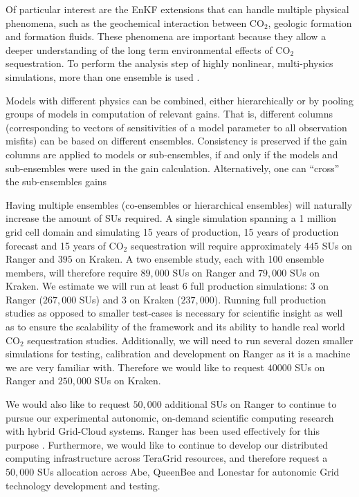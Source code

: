 \documentclass[a4paper,10pt]{article}
\begin{document}
Of particular interest are the EnKF extensions that can handle multiple physical phenomena,
such as the geochemical interaction between CO$_2$, geologic formation and formation fluids.
These phenomena are important because they allow a deeper understanding
of the long term environmental effects of CO$_2$ sequestration. To perform the analysis
step of highly nonlinear, multi-physics simulations, more than one ensemble is used 
\cite{Zhang,White1987,Durlofsky1992,Ballin1993,Gilks96,vanLeeuwen2003}.

Models with different physics can be combined, either hierarchically or by pooling 
groups of models in computation of relevant gains. That is, different  columns (corresponding to  
vectors of sensitivities of a model parameter to all observation misfits) can be based on different 
ensembles. Consistency is preserved if the gain columns are applied to models or sub-ensembles,
if and only if the models and sub-ensembles were used in the gain calculation. Alternatively, one 
can ``cross''  the sub-ensembles gains \cite{Mitchell02,Anderson2007,Michalak2003}

Having multiple ensembles (co-ensembles or hierarchical ensembles) will naturally increase the
amount of SUs required. A single simulation spanning a 1 million grid cell domain and simulating
15 years of production, 15 years of production forecast and 15 years of CO$_2$ sequestration will
require approximately $445$ SUs on Ranger and $395$ on Kraken. A two ensemble study, each with 100 ensemble members, 
will therefore require $89,000$ SUs on Ranger and $79,000$ SUs on Kraken. We estimate we will run 
at least $6$ full production 
simulations: $3$ on Ranger ($267,000$ SUs)  and $3$ on Kraken ($237,000$). Running
full production studies as opposed to smaller test-cases is necessary for scientific insight as 
well as to ensure the scalability of 
the framework and its ability to handle real world CO$_2$ sequestration studies. Additionally, we 
will need to run several dozen smaller simulations for testing, calibration and development on 
Ranger as it is a machine we are very familiar with. Therefore we would like to request $40000$ SUs 
on Ranger and $250,000$ SUs on Kraken.

We would also like to request $50,000$ additional SUs on Ranger to continue to pursue our 
experimental autonomic, on-demand scientific computing research with hybrid Grid-Cloud systems. 
Ranger has been
used effectively for this purpose \cite{Cloud1,Cloud2}. Furthermore, we would like to
continue to develop our distributed computing infrastructure across TeraGrid resources,
and therefore request a $50,000$ SUs allocation across Abe, QueenBee and Lonestar for autonomic 
Grid technology development and testing.
\end{document}
